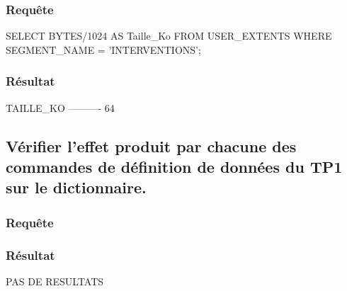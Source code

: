 \documentclass[•]{article}
\begin{document}
\subsubsection{Requête}
\begin{sql}
SELECT BYTES/1024 AS Taille_Ko FROM USER_EXTENTS WHERE SEGMENT_NAME = 'INTERVENTIONS';
\end{sql}
\subsubsection{Résultat}
\begin{sql}
 TAILLE_KO
----------
        64
\end{sql}

\subsection{Vérifier l’effet produit par chacune des commandes de définition de données du TP1 sur le dictionnaire.}
\subsubsection{Requête}
\begin{sql}
\end{sql}
\subsubsection{Résultat}
\begin{sql}
PAS DE RESULTATS
\end{sql}
\end{document}

